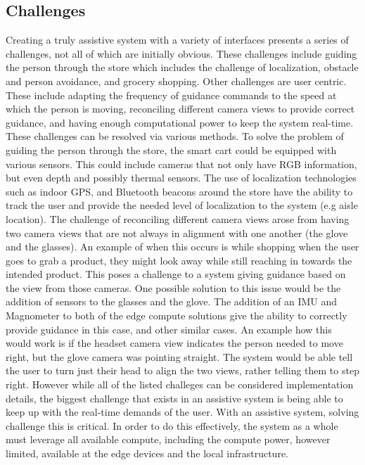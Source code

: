 \subsection{Challenges}
Creating a truly assistive system with a variety of interfaces presents a series 
of challenges, not all of which are initially obvious. These challenges include guiding the person
through the store which includes the challenge of localization, obstacle and person avoidance, and grocery shopping. 
Other challenges are user centric. These include adapting the frequency of guidance commands to the speed at which the person is moving, 
reconciling different camera views to provide correct guidance, and having enough computational power to keep the system real-time. 
These challenges can be resolved via various methods. To solve the problem of guiding the person through the store, the smart cart could be equipped with various sensors. 
This could include cameras that not only have RGB information, but even depth and possibly thermal sensors. 
The use of localization technologies such as indoor GPS, and Bluetooth beacons around the store have the ability to track the user and provide the needed level of localization to the system (e.g aisle location).
The challenge of reconciling different camera views arose from having two camera views that are not always in alignment with one another (the glove and the glasses). An example of when this occurs is
while shopping when the user goes to grab a product, they might look away while still reaching in towards the intended product. 
This poses a challenge to a system giving guidance based on the view from those cameras. One possible solution to this issue would be the addition of sensors 
to the glasses and the glove. The addition of an IMU and Magnometer to both of the edge compute solutions give the ability to correctly provide guidance in this case, and other similar cases. 
An example how this would work is if the headset camera view indicates the person needed to move right, 
but the glove camera was pointing straight. The system would be able tell the user to turn just their head to align the two views, rather telling them to step right.
However while all of the listed challeges can be considered implementation details, the biggest challenge that exists in an assistive system is being able to keep up with the real-time demands of the user. With an assistive system, 
solving challenge this is critical. In order to do this effectively, the system as a whole must leverage all available compute, including the compute power, however limited, available at the edge devices and the local infrastructure.
